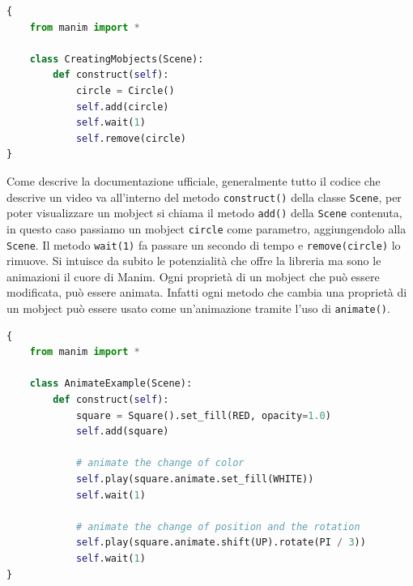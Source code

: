 \documentclass[binding=0.6cm]{sapthesis}
\begin{document}
{\scriptsize %
\begin{lstlisting}[language=Python, caption={Un primo esempio di utilizzo di Manim \cite{ManimDocs}}, label={codice:manim_example}]
{
    from manim import *

    class CreatingMobjects(Scene):
        def construct(self):
            circle = Circle()
            self.add(circle)
            self.wait(1)
            self.remove(circle)
}
\end{lstlisting}
}

Come descrive la documentazione ufficiale, generalmente tutto il codice che descrive un video va all'interno del metodo \lstinline|construct()|
della classe \lstinline|Scene|, per poter visualizzare un mobject si chiama il metodo \lstinline|add()| della \lstinline|Scene| contenuta, in questo caso
passiamo un mobject \lstinline|circle| come parametro, aggiungendolo alla \lstinline|Scene|.
Il metodo \lstinline|wait(1)| fa passare un secondo di tempo e \lstinline|remove(circle)| lo rimuove.
Si intuisce da subito le potenzialità che offre la libreria ma sono le animazioni il cuore di Manim.
Ogni proprietà di un mobject che può essere modificata, può essere animata. Infatti ogni metodo che cambia una proprietà di un mobject può essere
usato come un'animazione tramite l'uso di \lstinline|animate()|.

{\scriptsize %
\begin{lstlisting}[language=Python, caption={Un primo esempio di animazioni in Manim \cite{ManimDocs}}, label={codice:manim_animation_example}]
{
    from manim import *

    class AnimateExample(Scene):
        def construct(self):
            square = Square().set_fill(RED, opacity=1.0)
            self.add(square)
    
            # animate the change of color
            self.play(square.animate.set_fill(WHITE))
            self.wait(1)
    
            # animate the change of position and the rotation
            self.play(square.animate.shift(UP).rotate(PI / 3))
            self.wait(1)
}
\end{lstlisting}
}
\end{document}

